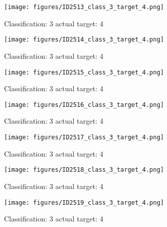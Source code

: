 \begin{figure}[h!]
\begin{center}
\texttt{[image: figures/ID2513\_class\_3\_target\_4.png]}
\end{center}
\caption{ Classification: 3 actual target: 4}
\label{fig:ID2513_class_3_target_4}
\end{figure}
\begin{figure}[h!]
\begin{center}
\texttt{[image: figures/ID2514\_class\_3\_target\_4.png]}
\end{center}
\caption{ Classification: 3 actual target: 4}
\label{fig:ID2514_class_3_target_4}
\end{figure}
\begin{figure}[h!]
\begin{center}
\texttt{[image: figures/ID2515\_class\_3\_target\_4.png]}
\end{center}
\caption{ Classification: 3 actual target: 4}
\label{fig:ID2515_class_3_target_4}
\end{figure}
\begin{figure}[h!]
\begin{center}
\texttt{[image: figures/ID2516\_class\_3\_target\_4.png]}
\end{center}
\caption{ Classification: 3 actual target: 4}
\label{fig:ID2516_class_3_target_4}
\end{figure}
\begin{figure}[h!]
\begin{center}
\texttt{[image: figures/ID2517\_class\_3\_target\_4.png]}
\end{center}
\caption{ Classification: 3 actual target: 4}
\label{fig:ID2517_class_3_target_4}
\end{figure}
\begin{figure}[h!]
\begin{center}
\texttt{[image: figures/ID2518\_class\_3\_target\_4.png]}
\end{center}
\caption{ Classification: 3 actual target: 4}
\label{fig:ID2518_class_3_target_4}
\end{figure}
\begin{figure}[h!]
\begin{center}
\texttt{[image: figures/ID2519\_class\_3\_target\_4.png]}
\end{center}
\caption{ Classification: 3 actual target: 4}
\label{fig:ID2519_class_3_target_4}
\end{figure}
